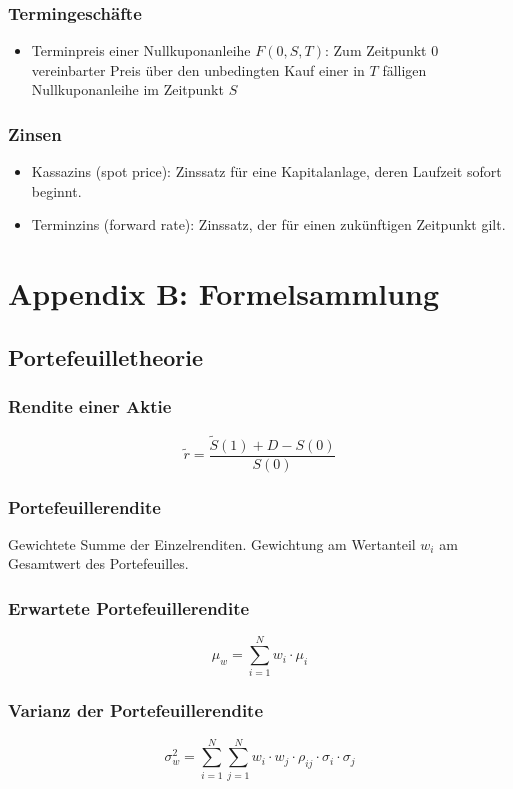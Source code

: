 \subsubsection{Termingeschäfte}
\begin{itemize}
	\item Terminpreis einer Nullkuponanleihe \(F(0, S, T)\): Zum Zeitpunkt \(0\) vereinbarter Preis über den unbedingten Kauf einer in \(T\) fälligen Nullkuponanleihe im Zeitpunkt \(S\)
\end{itemize}

\subsubsection{Zinsen}
\begin{itemize}
	\item Kassazins (spot price): Zinssatz für eine Kapitalanlage, deren Laufzeit sofort beginnt.
	\item Terminzins (forward rate): Zinssatz, der für einen zukünftigen Zeitpunkt gilt.
\end{itemize}



\section{Appendix B: Formelsammlung}

\subsection{Portefeuilletheorie}

\subsubsection{Rendite einer Aktie}
\[\tilde{r} = \frac{\tilde{S} (1) + D - S(0)}{S(0)}\]

\subsubsection{Portefeuillerendite}
Gewichtete Summe der Einzelrenditen. Gewichtung am Wertanteil \(w_i\) am Gesamtwert des Portefeuilles.

\subsubsection{Erwartete Portefeuillerendite}
\[\mu_w = \sum_{i=1}^{N} w_i \cdot \mu_i\]

\subsubsection{Varianz der Portefeuillerendite}
\[\sigma_w^2 = \sum_{i=1}^{N}\sum_{j=1}^{N} w_i \cdot w_j \cdot \rho_{ij} \cdot \sigma_i \cdot \sigma_j\]

